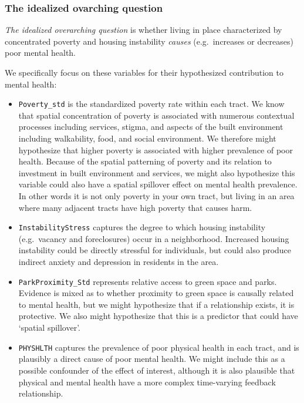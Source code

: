 \documentclass[
]{book}
\providecommand{\tightlist}{%
  \setlength{\itemsep}{0pt}\setlength{\parskip}{0pt}}
\begin{document}
\hypertarget{the-idealized-ovarching-question}{%
\subsubsection{The idealized ovarching question}\label{the-idealized-ovarching-question}}

\emph{The idealized overarching question} is whether living in place characterized by concentrated poverty and housing instability \emph{causes} (e.g.~increases or decreases) poor mental health.

We specifically focus on these variables for their hypothesized contribution to mental health:

\begin{itemize}
\tightlist
\item
  \texttt{Poverty\_std} is the standardized poverty rate within each tract. We know that spatial concentration of poverty is associated with numerous contextual processes including services, stigma, and aspects of the built environment including walkability, food, and social environment. We therefore might hypothesize that higher poverty is associated with higher prevalence of poor health. Because of the spatial patterning of poverty and its relation to investment in built environment and services, we might also hypothesize this variable could also have a spatial spillover effect on mental health prevalence. In other words it is not only poverty in your own tract, but living in an area where many adjacent tracts have high poverty that causes harm.
\item
  \texttt{InstabilityStress} captures the degree to which housing instability (e.g.~vacancy and foreclosures) occur in a neighborhood. Increased housing instability could be directly stressful for individuals, but could also produce indirect anxiety and depression in residents in the area.
\item
  \texttt{ParkProximity\_Std} represents relative access to green space and parks. Evidence is mixed as to whether proximity to green space is causally related to mental health, but we might hypothesize that if a relationship exists, it is protective. We also might hypothesize that this is a predictor that could have `spatial spillover'.
\item
  \texttt{PHYSHLTH} captures the prevalence of poor physical health in each tract, and is plausibly a direct cause of poor mental health. We might include this as a possible confounder of the effect of interest, although it is also plausible that physical and mental health have a more complex time-varying feedback relationship.
\end{itemize}
\end{document}
